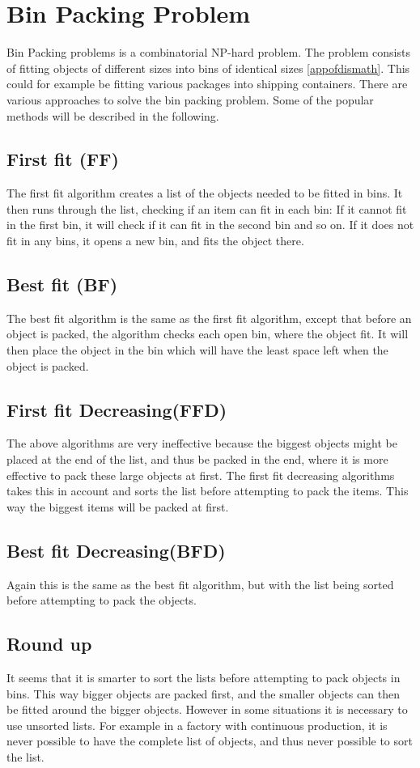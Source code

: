

\section{Bin Packing Problem}
\label{sec:binpacking}
Bin Packing problems is a combinatorial NP-hard problem. The problem consists of fitting objects of different sizes into bins of identical sizes \ref{appofdismath}. This could for example be fitting various packages into shipping containers. There are various approaches to solve the bin packing problem. Some of the popular methods will be described in the following. 

\subsection{First fit (FF)}
The first fit algorithm creates a list of the objects needed to be fitted in bins. It then runs through the list, checking if an item can fit in each bin: If it cannot fit in the first bin, it will check if it can fit in the second bin and so on. If it does not fit in any bins, it opens a new bin, and fits the object there. 

\subsection{Best fit (BF)}
The best fit algorithm is the same as the first fit algorithm, except that before an object is packed, the algorithm checks each open bin, where the object fit. It will then place the object in the bin which will have the least space left when the object is packed. 

\subsection{First fit Decreasing(FFD)}
The above algorithms are very ineffective because the biggest objects might be placed at the end of the list, and thus be packed in the end, where it is more effective to pack these large objects at first.
The first fit decreasing algorithms takes this in account and sorts the list before attempting to pack the items. This way the biggest items will be packed at first.

\subsection{Best fit Decreasing(BFD)}
Again this is the same as the best fit algorithm, but with the list being sorted before attempting to pack the objects.

\subsection{Round up}
It seems that it is smarter to sort the lists before attempting to pack objects in bins. This way bigger objects are packed first, and the smaller objects can then be fitted around the bigger objects. However in some situations it is necessary to use unsorted lists. For example in a factory with continuous production, it is never possible to have the complete list of objects, and thus never possible to sort the list.

